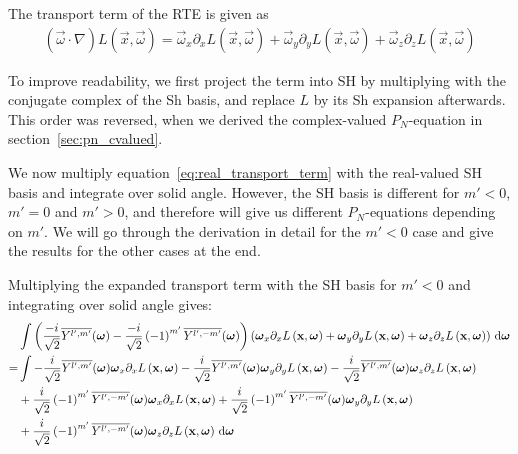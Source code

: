 The transport term of the RTE is given as
\begin{align}
(\vec{\omega}\cdot\nabla)L(\vec{x}, \vec{\omega})
=
\vec{\omega}_{x}\partial_xL\left (\vec{x} ,\vec{\omega} \right )+\vec{\omega}_{y}\partial_yL\left (\vec{x} ,\vec{\omega} \right )+\vec{\omega}_{z}\partial_zL\left (\vec{x} ,\vec{\omega} \right )
\label{eq:real_transport_term}
\end{align}

To improve readability, we first project the term into SH by multiplying with the conjugate complex of the Sh basis, and replace $L$ by its Sh expansion afterwards. This order was reversed, when we derived the complex-valued $P_N$-equation in section~\ref{sec:pn_cvalued}.

We now multiply equation~\ref{eq:real_transport_term} with the real-valued SH basis and integrate over solid angle. However, the SH basis is different for $m'<0$, $m'=0$ and $m'>0$, and therefore will give us different $P_N$-equations depending on $m'$. We will go through the derivation in detail for the $m'<0$ case and give the results for the other cases at the end.

Multiplying the expanded transport term with the SH basis for $m'<0$ and integrating over solid angle gives:
\begin{align*}
&\int{\left(\frac{-i}{\sqrt{2}}\overline{Y^{l', m'}}(\boldsymbol{\mathbf{\omega}} )-\frac{-i}{\sqrt{2}}\left({-1}\right)^{m'}\overline{Y^{l', -m'}}(\boldsymbol{\mathbf{\omega}} )\right)\left(\boldsymbol{\mathbf{\omega}}_{x}\partial_xL\left (\boldsymbol{\mathbf{x}} ,\boldsymbol{\mathbf{\omega}} \right )+\boldsymbol{\mathbf{\omega}}_{y}\partial_yL\left (\boldsymbol{\mathbf{x}} ,\boldsymbol{\mathbf{\omega}} \right )+\boldsymbol{\mathbf{\omega}}_{z}\partial_zL\left (\boldsymbol{\mathbf{x}} ,\boldsymbol{\mathbf{\omega}} \right )\right)\,\mathrm{d}\boldsymbol{\mathbf{\omega}}}
\\
=&
\int-\frac{i}{\sqrt{2}}\overline{Y^{l', m'}}(\boldsymbol{\mathbf{\omega}} )\boldsymbol{\mathbf{\omega}}_{x}\partial_xL\left (\boldsymbol{\mathbf{x}} ,\boldsymbol{\mathbf{\omega}} \right )-\frac{i}{\sqrt{2}}\overline{Y^{l', m'}}(\boldsymbol{\mathbf{\omega}} )\boldsymbol{\mathbf{\omega}}_{y}\partial_yL\left (\boldsymbol{\mathbf{x}} ,\boldsymbol{\mathbf{\omega}} \right )-\frac{i}{\sqrt{2}}\overline{Y^{l', m'}}(\boldsymbol{\mathbf{\omega}} )\boldsymbol{\mathbf{\omega}}_{z}\partial_zL\left (\boldsymbol{\mathbf{x}} ,\boldsymbol{\mathbf{\omega}} \right )
\\&
+\frac{i}{\sqrt{2}}\left({-1}\right)^{m'}\overline{Y^{l', -m'}}(\boldsymbol{\mathbf{\omega}} )\boldsymbol{\mathbf{\omega}}_{x}\partial_xL\left (\boldsymbol{\mathbf{x}} ,\boldsymbol{\mathbf{\omega}} \right )+\frac{i}{\sqrt{2}}\left({-1}\right)^{m'}\overline{Y^{l', -m'}}(\boldsymbol{\mathbf{\omega}} )\boldsymbol{\mathbf{\omega}}_{y}\partial_yL\left (\boldsymbol{\mathbf{x}} ,\boldsymbol{\mathbf{\omega}} \right )
\\&
+\frac{i}{\sqrt{2}}\left({-1}\right)^{m'}\overline{Y^{l', -m'}}(\boldsymbol{\mathbf{\omega}} )\boldsymbol{\mathbf{\omega}}_{z}\partial_zL\left (\boldsymbol{\mathbf{x}} ,\boldsymbol{\mathbf{\omega}} \right )\,\mathrm{d}\boldsymbol{\mathbf{\omega}}
\end{align*}

